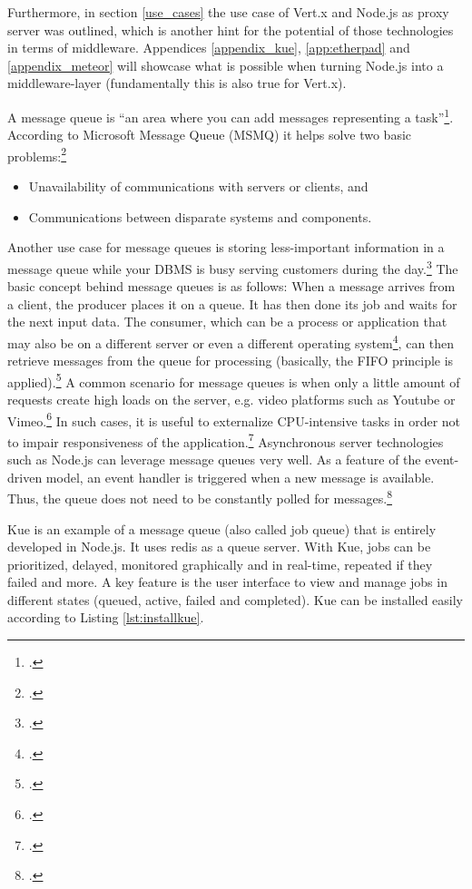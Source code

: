 \begin{appendices}
\begin{subappendices}
Furthermore, in section \ref{use_cases} the use case of Vert.x and Node.js as proxy server was outlined, which is another hint for the potential of those technologies in terms of middleware. Appendices \ref{appendix_kue}, \ref{app:etherpad} and \ref{appendix_meteor} will showcase what is possible when turning Node.js into a middleware-layer (fundamentally this is also true for Vert.x). 

\label{appendix_kue}

A message queue is “an area where you can add messages representing a task”\footcite[][2]{McGlennon_2007}. According to Microsoft Message Queue (MSMQ) it helps solve two basic problems:\footcite[Cf.][1]{McGlennon_2007}
\begin{itemize}
  \item Unavailability of communications with servers or clients, and 
  \item Communications between disparate systems and components.
\end{itemize}
Another use case for message queues is storing less-important information in a message queue while your DBMS is busy serving customers during the day.\footcite[Cf.][449]{Thomson_2002}
The basic concept behind message queues is as follows: When a message arrives from a client, the producer places it on a queue. It has then done its job and waits for the next input data. The consumer, which can be a process or application that may also be on a different server or even a different operating system\footcite[Cf.][2]{McGlennon_2007}, can then retrieve messages from the queue for processing (basically, the FIFO principle is applied).\footcite[Cf.][450]{Thomson_2002}
A common scenario for message queues is when only a little amount of requests create high loads on the server, e.g. video platforms such as Youtube or Vimeo.\footcite[Cf.][247]{Roden_2012} In such cases, it is useful to externalize CPU-intensive tasks in order not to impair responsiveness of the application.\footcite[Cf.][247]{Roden_2012}
Asynchronous server technologies such as Node.js can leverage message queues very well. As a feature of the event-driven model, an event handler is triggered when a new message is available. Thus, the queue does not need to be constantly polled for messages.\footcite[Cf.][]{Knight_2011}

Kue is an example of a message queue (also called job queue) that is entirely developed in Node.js. It uses redis as a queue server. With Kue, jobs can be prioritized, delayed, monitored graphically and in real-time, repeated if they failed and more. A key feature is the user interface to view and manage jobs in different states (queued, active, failed and completed). Kue can be installed easily according to Listing \ref{lst:installkue}.


\end{subappendices}
\end{appendices}
